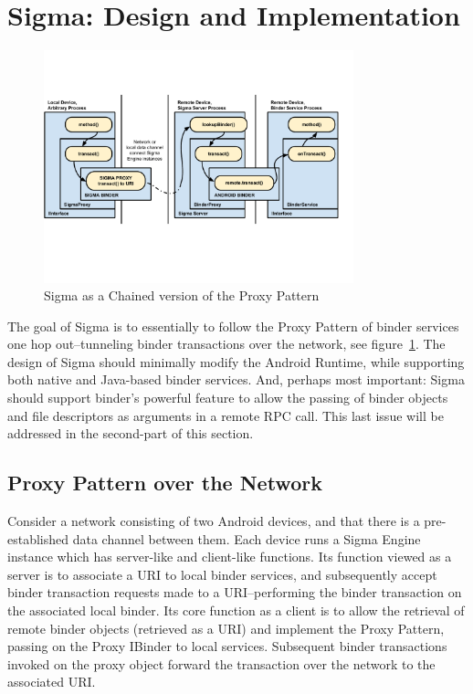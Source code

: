 \documentclass[prodmode]{acmlarge}
\begin{document}
\section{Sigma: Design and Implementation}
\label{sec:Sigma}
\begin{figure}[h]
\centering
\includegraphics[width=0.8\textwidth]{drawings/sigma_proxy_pattern.pdf}
\caption{Sigma as a Chained version of the Proxy Pattern}
\label{fig:SigmaChainProxy}
\end{figure}
The goal of Sigma is to essentially to follow the Proxy Pattern of binder services one hop out--tunneling binder transactions over the network, see figure~\ref{fig:SigmaChainProxy}. The design of Sigma should minimally modify the Android Runtime, while supporting both native and Java-based binder services. And, perhaps most important: Sigma should support binder's powerful feature to allow the passing of binder objects and file descriptors as arguments in a remote RPC call. This last issue will be addressed in the second-part of this section.

\subsection{Proxy Pattern over the Network}

Consider a network consisting of two Android devices, and that there is a pre-established data channel between them. Each device runs a Sigma Engine instance which has server-like and client-like functions. Its function viewed as a server is to associate a URI to local binder services, and subsequently accept binder transaction requests made to a URI--performing the binder transaction on the associated local binder. Its core function as a client is to allow the retrieval of remote binder objects (retrieved as a URI) and implement the Proxy Pattern, passing on the Proxy IBinder to local services. Subsequent binder transactions invoked on the proxy object forward the transaction over the network to the associated URI.
\end{document}
